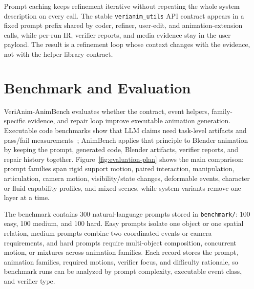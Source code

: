 \documentclass{article}
\newcommand{\code}[1]{\texttt{#1}}
\begin{document}
Prompt caching keeps refinement iterative without repeating the whole system description on every call. The stable \code{verianim\_utils} API contract appears in a fixed prompt prefix shared by coder, refiner, user-edit, and animation-extension calls, while per-run IR, verifier reports, and media evidence stay in the user payload. The result is a refinement loop whose context changes with the evidence, not with the helper-library contract.

\section{Benchmark and Evaluation}

VeriAnim-AnimBench evaluates whether the contract, event helpers, family-specific evidence, and repair loop improve executable animation generation. Executable code benchmarks show that LLM claims need task-level artifacts and pass/fail measurements~\citep{chen2021evaluating,jimenez2024swebench}; AnimBench applies that principle to Blender animation by keeping the prompt, generated code, Blender artifacts, verifier reports, and repair history together. Figure~\ref{fig:evaluation-plan} shows the main comparison: prompt families span rigid support motion, paired interaction, manipulation, articulation, camera motion, visibility/state changes, deformable events, character or fluid capability profiles, and mixed scenes, while system variants remove one layer at a time.

The benchmark contains 300 natural-language prompts stored in \code{benchmark/}: 100 easy, 100 medium, and 100 hard. Easy prompts isolate one object or one spatial relation, medium prompts combine two coordinated events or camera requirements, and hard prompts require multi-object composition, concurrent motion, or mixtures across animation families. Each record stores the prompt, animation families, required motions, verifier focus, and difficulty rationale, so benchmark runs can be analyzed by prompt complexity, executable event class, and verifier type.
\end{document}
